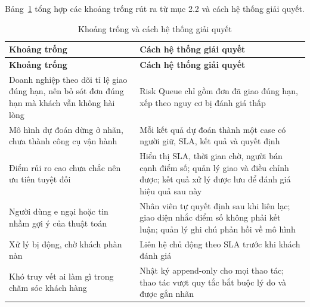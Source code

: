 Bảng~\ref{tab:khoang-trong} tổng hợp các khoảng trống rút ra từ mục 2.2 và cách hệ thống giải quyết.

{\small
\renewcommand{\arraystretch}{1.25}
\begin{longtable}{|>{\raggedright\arraybackslash}p{5cm}|>{\raggedright\arraybackslash}p{9.8cm}|}
\caption{Khoảng trống và cách hệ thống giải quyết}\label{tab:khoang-trong}\\ \hline
\textbf{Khoảng trống} & \textbf{Cách hệ thống giải quyết} \\ \hline \endfirsthead
\hline \textbf{Khoảng trống} & \textbf{Cách hệ thống giải quyết} \\ \hline \endhead
Doanh nghiệp theo dõi tỉ lệ giao đúng hạn, nên bỏ sót đơn đúng hạn mà khách vẫn không hài lòng \parencite{ravula2023} & Risk Queue chỉ gồm đơn đã giao đúng hạn, xếp theo nguy cơ bị đánh giá thấp \\ \hline
Mô hình dự đoán dừng ở nhãn, chưa thành công cụ vận hành \parencite{orman2026} & Mỗi kết quả dự đoán thành một case có người giữ, SLA, kết quả và quyết định \\ \hline
Điểm rủi ro cao chưa chắc nên ưu tiên tuyệt đối \parencite{ascarza2018, li2026} & Hiển thị SLA, thời gian chờ, người bán cạnh điểm số; quản lý giao và điều chỉnh được; kết quả xử lý được lưu để đánh giá hiệu quả sau này \\ \hline
Người dùng e ngại hoặc tin nhầm gợi ý của thuật toán \parencite{dietvorst2018, bansal2021} & Nhân viên tự quyết định sau khi liên lạc; giao diện nhắc điểm số không phải kết luận; quản lý ghi chú phản hồi về mô hình \\ \hline
Xử lý bị động, chờ khách phàn nàn \parencite{nazifi2021} & Liên hệ chủ động theo SLA trước khi khách đánh giá \\ \hline
Khó truy vết ai làm gì trong chăm sóc khách hàng & Nhật ký append-only cho mọi thao tác; thao tác vượt quy tắc bắt buộc lý do và được gắn nhãn \\ \hline
\end{longtable}
}
